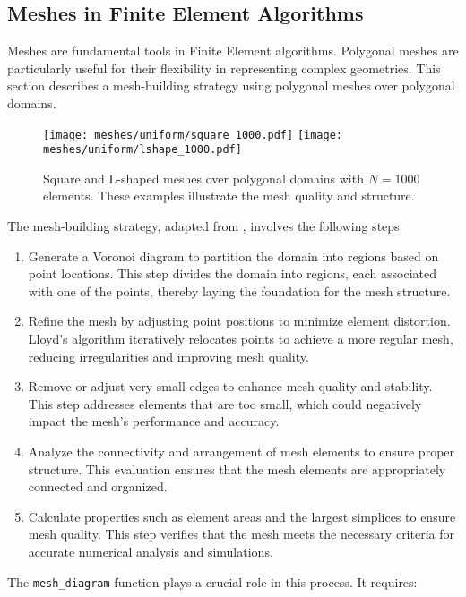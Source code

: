 \subsection{Meshes in Finite Element Algorithms}

Meshes are fundamental tools in Finite Element algorithms. Polygonal meshes are particularly useful for their flexibility in representing complex geometries. This section describes a mesh-building strategy using polygonal meshes over polygonal domains.

\begin{figure}[!ht]
    \centering
    \texttt{[image: meshes/uniform/square\_1000.pdf]}
    \texttt{[image: meshes/uniform/lshape\_1000.pdf]}
    \caption{Square and L-shaped meshes over polygonal domains with $N = 1000$ elements. These examples illustrate the mesh quality and structure.}
\end{figure}

The mesh-building strategy, adapted from \cite{Talischi2012}, involves the following steps:

\begin{enumerate}
    \item Generate a Voronoi diagram to partition the domain into regions based on point locations. This step divides the domain into regions, each associated with one of the points, thereby laying the foundation for the mesh structure.
    \item Refine the mesh by adjusting point positions to minimize element distortion. Lloyd's algorithm iteratively relocates points to achieve a more regular mesh, reducing irregularities and improving mesh quality.
    \item Remove or adjust very small edges to enhance mesh quality and stability. This step addresses elements that are too small, which could negatively impact the mesh's performance and accuracy.
    \item Analyze the connectivity and arrangement of mesh elements to ensure proper structure. This evaluation ensures that the mesh elements are appropriately connected and organized.
    \item Calculate properties such as element areas and the largest simplices to ensure mesh quality. This step verifies that the mesh meets the necessary criteria for accurate numerical analysis and simulations.
\end{enumerate}

The  \lstinline{mesh_diagram} function plays a crucial role in this process. It requires:

